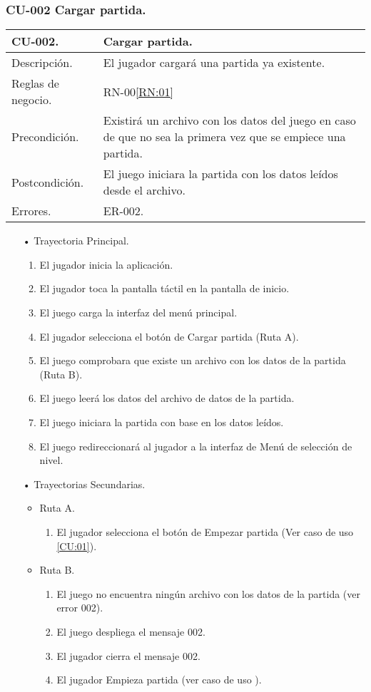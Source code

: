 \subsubsection{CU-002 Cargar partida.} \label{CU:02}
\begin{longtable}[c]{ | m{5cm} | m{10cm}|} 
		\hline
		\rowcolor{cyan}CU-002. & Cargar partida. \\ 
		\hline
		Descripción. & El jugador cargará una partida ya existente. \\ 
		\hline
		Reglas de negocio. & RN-00\ref{RN:01}\\ 
		\hline
		Precondición. & Existirá un archivo con los datos del juego en caso de que no sea la primera vez que se empiece una partida. \\
		\hline
		Postcondición. & El juego iniciara la partida con los datos leídos desde el archivo.\\
		\hline
		Errores. & ER-002.\\
		\hline
\end{longtable}
\begin{itemize}
	\item[•] Trayectoria Principal.
		\begin{enumerate}
			\item El jugador inicia la aplicación.
			\item El jugador toca la pantalla táctil en la pantalla de inicio.
			\item El juego carga la interfaz del menú principal.
			\item El jugador selecciona el botón de Cargar partida (Ruta A).
			\item El juego comprobara que existe un archivo con los datos de la partida (Ruta B).
			\item El juego leerá los datos del archivo de datos de la partida.
			\item El juego iniciara la partida con base en los datos leídos.
			\item El juego redireccionará al jugador a la interfaz de Menú de selección de nivel.

		\end{enumerate}
	\item[•] Trayectorias Secundarias.
		\begin{itemize}
			\item Ruta A. 
				\begin{enumerate}
					\item El jugador selecciona el botón de Empezar partida (Ver caso de uso \ref{CU:01}).
				\end{enumerate}
			\item Ruta B.
				\begin{enumerate}
					\item El juego no encuentra ningún archivo con los datos de la partida (ver error 002).
					\item El juego despliega el mensaje 002.
					\item El jugador cierra el mensaje 002.
					\item El jugador Empieza partida (ver caso de uso ).

				\end{enumerate}
		\end{itemize}
\end{itemize}